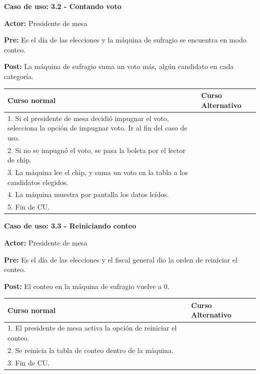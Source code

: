 \textbf{Caso de uso: 3.2 - Contando voto}

\textbf{Actor:} Presidente de mesa

\textbf{Pre:} Es el día de las elecciones y la máquina de sufragio se encuentra en modo conteo.

\textbf{Post:} La máquina de sufragio suma un voto más, algún candidato en cada categoría.

\newpage

\begin{table}[h!]
	
 \begin{tabular}{|p{7.5cm} | p{7.5cm}|} 
 \hline
 \textbf{Curso normal} & \textbf{Curso Alternativo} \\
 \hline


1. Si el presidente de mesa decidió impugnar el voto, selecciona la opción de impugnar voto. Ir al fin del caso de uso. & \\

\hline

2. Si no se impugnó el voto, se pasa la boleta por el lector de chip. & \\

\hline


3. La máquina lee el chip, y suma un voto en la tabla a los candidatos elegidos. & \\

\hline

4. La máquina muestra por pantalla los datos leídos. & \\

\hline

5. Fin de CU. & \\
\hline
\end{tabular}
\end{table}


\textbf{Caso de uso: 3.3 - Reiniciando conteo}

\textbf{Actor:} Presidente de mesa

\textbf{Pre:} Es el día de las elecciones y el fiscal general dio la orden de reiniciar el conteo.

\textbf{Post:} El conteo en la máquina de sufragio vuelve a 0.

\begin{table}[h!]
	
 \begin{tabular}{|p{7.5cm} | p{7.5cm}|} 
 \hline
 \textbf{Curso normal} & \textbf{Curso Alternativo} \\
 \hline


1. El presidente de mesa activa la opción de reiniciar el conteo. & \\
\hline

2. Se reinicia la tabla de conteo dentro de la máquina. & \\
\hline


3. Fin de CU. & \\
\hline
\end{tabular}
\end{table}


